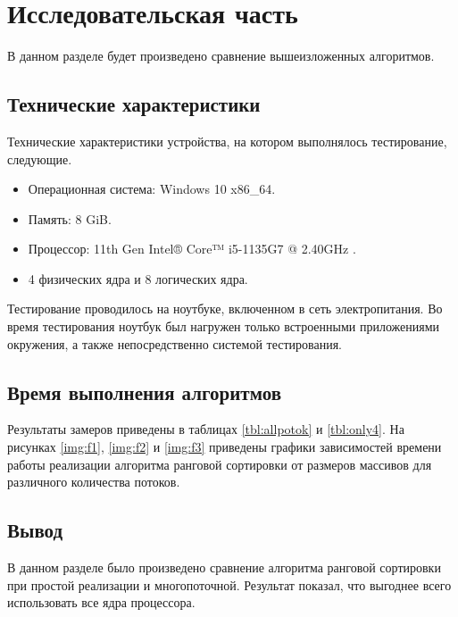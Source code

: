 \chapter{Исследовательская часть}
В данном разделе будет произведено сравнение вышеизложенных алгоритмов.

\section{Технические характеристики}

Технические характеристики устройства, на котором выполнялось тестирование, следующие.

\begin{itemize}
	\item Операционная система: Windows 10 \cite{oswind} x86\_64.
	\item Память: 8 GiB.
	\item Процессор: 11th Gen Intel® Core™ i5-1135G7 @ 2.40GHz \cite{intel}.
	\item 4 физических ядра и 8 логических ядра.
\end{itemize}

Тестирование проводилось на ноутбуке, включенном в сеть электропитания. Во время тестирования ноутбук был нагружен только встроенными приложениями окружения, а также непосредственно системой тестирования.

\section{Время выполнения алгоритмов}

Результаты замеров приведены в таблицах \ref{tbl:allpotok} и \ref{tbl:only4}.
На рисунках \ref{img:f1}, \ref{img:f2} и \ref{img:f3} приведены графики зависимостей времени работы реализации алгоритма ранговой сортировки от размеров массивов для различного количества потоков. 





\section*{Вывод}

В данном разделе было произведено сравнение алгоритма ранговой сортировки при простой реализации и многопоточной. Результат показал, что выгоднее всего использовать все ядра процессора.